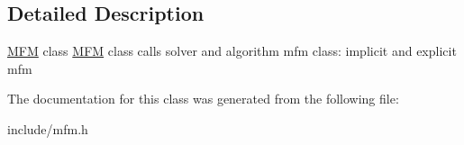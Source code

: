 \subsection{Detailed Description}
\hyperlink{classmfm_1_1_m_f_m}{M\+FM} class  \hyperlink{classmfm_1_1_m_f_m}{M\+FM} class calls solver and algorithm  mfm class\+: implicit and explicit mfm 

The documentation for this class was generated from the following file\+:\begin{DoxyCompactItemize}
\item 
include/mfm.\+h\end{DoxyCompactItemize}
